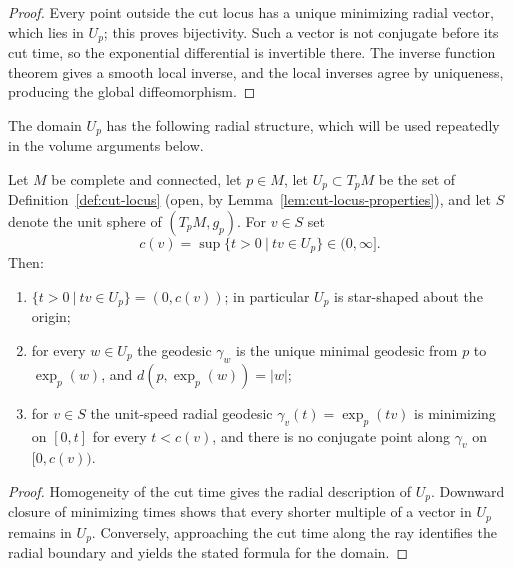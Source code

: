\begin{proof}
\sketch
{}
Every point outside the cut locus has a unique minimizing radial vector, which lies in $U_p$; this proves bijectivity. Such a vector is not conjugate before its cut time, so the exponential differential is invertible there. The inverse function theorem gives a smooth local inverse, and the local inverses agree by uniqueness, producing the global diffeomorphism.
\end{proof}

The domain $U_p$ has the following radial structure, which will be
used repeatedly in the volume arguments below.

\begin{lemma}
\label{lem:cut-time-star-shaped}
\leanok

Let $M$ be complete and connected, let $p\in M$, let
$U_p\subset T_pM$ be the
set of Definition~\ref{def:cut-locus} (open, by
Lemma~\ref{lem:cut-locus-properties}), and let $S$ denote the
unit sphere of $(T_pM,g_p)$. For $v\in S$ set
$$c(v)=\sup\{t>0\ |\ tv\in U_p\}\in(0,\infty].$$
Then:
\begin{enumerate}
\item $\{t>0\ |\ tv\in U_p\}=(0,c(v))$; in particular $U_p$ is
star-shaped about the origin;
\item for every $w\in U_p$ the geodesic $\gamma_w$ is the unique
minimal geodesic from $p$ to $\exp_p(w)$, and
$d(p,\exp_p(w))=|w|$;
\item for $v\in S$ the unit-speed radial geodesic
$\gamma_v(t)=\exp_p(tv)$ is minimizing on $[0,t]$ for every
$t<c(v)$, and there is no conjugate point along $\gamma_v$ on
$[0,c(v))$.
\end{enumerate}
\end{lemma}

\begin{proof}
\sketch
{}
Homogeneity of the cut time gives the radial description of $U_p$. Downward closure of minimizing times shows that every shorter multiple of a vector in $U_p$ remains in $U_p$. Conversely, approaching the cut time along the ray identifies the radial boundary and yields the stated formula for the domain.
\end{proof}




